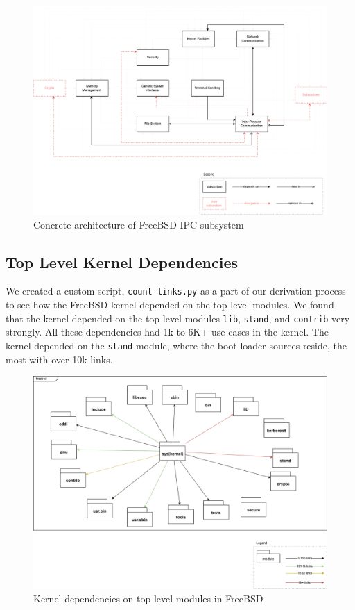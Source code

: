 \documentclass[12pt, dvipsnames, a4paper]{article}
\newcommand{\code}[1]{\texttt{#1}}
\begin{document}
\begin{figure}[!htb]
	\center
	\includegraphics[width = 390pt]{assets/ipc-concrete-architecture.png}
	\caption{Concrete architecture of FreeBSD IPC subsystem}
	\label{fig:concreteIPC}
\end{figure}
\subsection{Top Level Kernel Dependencies}

We created a custom script, \code{count-links.py} as a part of our derivation process to see how the FreeBSD kernel depended on the top level modules. We found that the kernel depended on the top level modules \code{lib}, \code{stand}, and \code{contrib} very strongly. All these dependencies had 1k to 6K+ use cases in the kernel. The kernel depended on the \code{stand} module, where the boot loader sources reside, the most with over 10k links.
\begin{figure}[!htb]
	\center
	\includegraphics[width = 390pt]{assets/kernel-dependencies.png}
	\caption{Kernel dependencies on top level modules in FreeBSD}
\end{figure}
\clearpage
\end{document}
